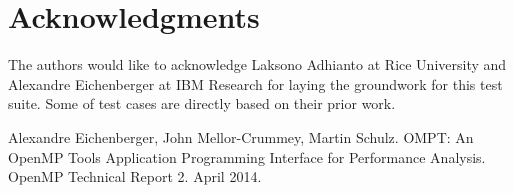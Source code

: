 \documentclass{article}
\begin{document}
\section*{Acknowledgments}

The authors would like to acknowledge Laksono Adhianto at Rice University and Alexandre Eichenberger at IBM Research for 
laying the groundwork for this test suite. Some of test cases are directly based on their prior work.

 
 


\appendix

\begin{thebibliography}{9}

 Alexandre Eichenberger, John Mellor-Crummey, Martin Schulz. OMPT: An OpenMP\textsuperscript{\textregistered} Tools Application Programming Interface for Performance Analysis. OpenMP Technical Report 2. April 2014.

\end{thebibliography}
\end{document}
